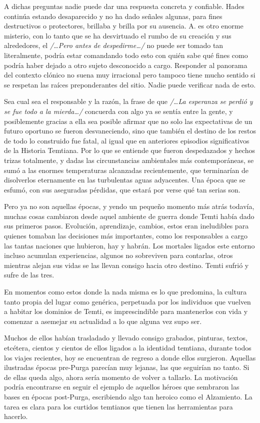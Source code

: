 \documentclass[
]{book}
\begin{document}
A dichas preguntas nadie puede dar una respuesta concreta y confiable. Hades continúa estando desaparecido y no ha dado señales algunas, para fines destructivos o protectores, brillaba y brilla por su ausencia. A. es otro enorme misterio, con lo tanto que se ha desvirtuado el rumbo de su creación y sus alrededores, el \emph{/\ldots Pero antes de despedirme\ldots/} no puede ser tomado tan literalmente, podría estar comandando todo esto con quién sabe qué fines como podría haber dejado a otro sujeto desconocido a cargo. Responder al panorama del contexto clónico no suena muy irracional pero tampoco tiene mucho sentido si se respetan las raíces preponderantes del sitio. Nadie puede verificar nada de esto.

Sea cual sea el responsable y la razón, la frase de que \emph{/\ldots La esperanza se perdió y se fue todo a la mierda\ldots/} concuerda con algo ya se sentía entre la gente, y posiblemente gracias a ella sea posible afirmar que no solo las expectativas de un futuro oportuno se fueron desvaneciendo, sino que también el destino de los restos de todo lo construido fue fatal, al igual que en anteriores episodios significativos de la Historia Temtiana. Por lo que se entiende que fueron despedazados y hechos trizas totalmente, y dadas las circunstancias ambientales más contemporáneas, se sumó a las enormes temperaturas alcanzadas recientemente, que terminarían de disolverlos eternamente en las turbulentas aguas adyacentes. Una época que se esfumó, con sus aseguradas pérdidas, que estará por verse qué tan serias son.

Pero ya no son aquellas épocas, y yendo un pequeño momento más atrás todavía, muchas cosas cambiaron desde aquel ambiente de guerra donde Temti había dado sus primeros pasos. Evolución, aprendizaje, cambios, estos eran ineludibles para quienes tomaban las decisiones más importantes, como los responsables a cargo las tantas naciones que hubieron, hay y habrán. Los mortales ligados este entorno incluso acumulan experiencias, algunos no sobreviven para contarlas, otros mientras alejan sus vidas se las llevan consigo hacia otro destino. Temti sufrió y sufre de las tres.

En momentos como estos donde la nada misma es lo que predomina, la cultura tanto propia del lugar como genérica, perpetuada por los individuos que vuelven a habitar los dominios de Temti, es imprescindible para mantenerlos con vida y comenzar a asemejar su actualidad a lo que alguna vez supo ser.

Muchos de ellos habían trasladado y llevado consigo grabados, pinturas, textos, etcétera, cientos y cientos de ellos ligados a la identidad temtiana, durante todos los viajes recientes, hoy se encuentran de regreso a donde ellos surgieron. Aquellas ilustradas épocas pre-Purga parecían muy lejanas, las que seguirían no tanto. Si de ellas queda algo, ahora sería momento de volver a tallarlo. La motivación podría encontrarse en seguir el ejemplo de aquellos héroes que sembraron las bases en épocas post-Purga, escribiendo algo tan heroico como el Alzamiento. La tarea es clara para los curtidos temtianos que tienen las herramientas para hacerlo.
\end{document}
